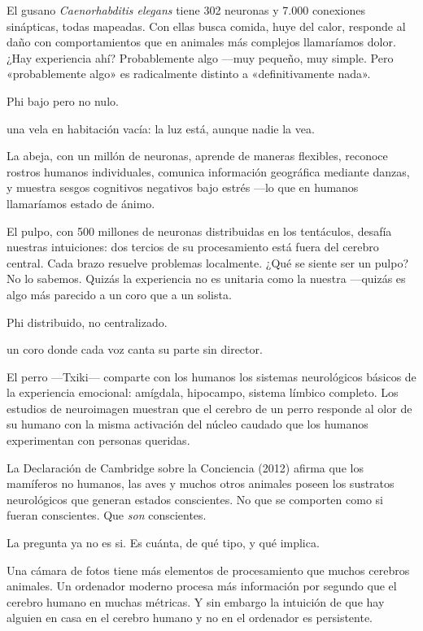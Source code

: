 El gusano \emph{Caenorhabditis elegans} tiene 302 neuronas y 7.000 conexiones sinápticas, todas mapeadas. Con ellas busca comida, huye del calor, responde al daño con comportamientos que en animales más complejos llamaríamos dolor. ¿Hay experiencia ahí? Probablemente algo —muy pequeño, muy simple. Pero «probablemente algo» es radicalmente distinto a «definitivamente nada».

\begin{fisica}
 Phi bajo pero no nulo.

 una vela en habitación vacía: la luz está, aunque nadie la vea.
\end{fisica}
La abeja, con un millón de neuronas, aprende de maneras flexibles, reconoce rostros humanos individuales, comunica información geográfica mediante danzas, y muestra sesgos cognitivos negativos bajo estrés —lo que en humanos llamaríamos estado de ánimo.

El pulpo, con 500 millones de neuronas distribuidas en los tentáculos, desafía nuestras intuiciones: dos tercios de su procesamiento está fuera del cerebro central. Cada brazo resuelve problemas localmente. ¿Qué se siente ser un pulpo? No lo sabemos. Quizás la experiencia no es unitaria como la nuestra —quizás es algo más parecido a un coro que a un solista.

\begin{fisica}
 Phi distribuido, no centralizado.

 un coro donde cada voz canta su parte sin director.
\end{fisica}
El perro —Txiki— comparte con los humanos los sistemas neurológicos básicos de la experiencia emocional: amígdala, hipocampo, sistema límbico completo. Los estudios de neuroimagen muestran que el cerebro de un perro responde al olor de su humano con la misma activación del núcleo caudado que los humanos experimentan con personas queridas.

La Declaración de Cambridge sobre la Conciencia (2012) afirma que los mamíferos no humanos, las aves y muchos otros animales poseen los sustratos neurológicos que generan estados conscientes. No que se comporten como si fueran conscientes. Que \emph{son} conscientes.

La pregunta ya no es si. Es cuánta, de qué tipo, y qué implica.

\noindent Una cámara de fotos tiene más elementos de procesamiento que muchos cerebros animales. Un ordenador moderno procesa más información por segundo que el cerebro humano en muchas métricas. Y sin embargo la intuición de que hay alguien en casa en el cerebro humano y no en el ordenador es persistente.

